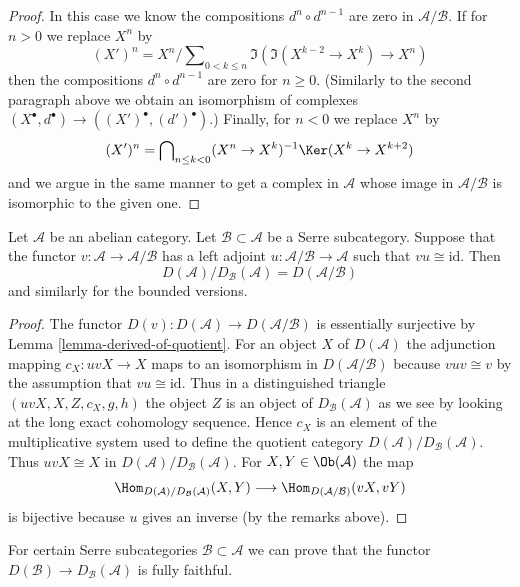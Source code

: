 \begin{proof}
\medskip\noindent
In this case we know the compositions $d^n \circ d^{n - 1}$
are zero in $\mathcal{A}/\mathcal{B}$. If for $n > 0$ we replace
$X^n$ by
$$
(X')^n = X^n/\sum\nolimits_{0 < k \leq n} \Im(\Im(X^{k - 2} \to X^k) \to X^n)
$$
then the compositions $d^n \circ d^{n - 1}$ are zero for $n \geq 0$.
(Similarly to the second paragraph above we obtain an isomorphism of
complexes
$(X^\bullet, d^\bullet) \to ((X')^\bullet, (d')^\bullet)$.)
Finally, for $n < 0$ we replace $X^n$ by
$$
(X')^n = \bigcap\nolimits_{n \leq k < 0}
(X^n \to X^k)^{-1}\Ker(X^k \to X^{k + 2})
$$
and we argue in the same manner to get a complex in $\mathcal{A}$
whose image in $\mathcal{A}/\mathcal{B}$ is isomorphic to the given one.
\end{proof}

\begin{lemma}
\label{lemma-quotient-by-serre-easy}
Let $\mathcal{A}$ be an abelian category.
Let $\mathcal{B} \subset \mathcal{A}$ be a Serre subcategory.
Suppose that the functor $v : \mathcal{A} \to \mathcal{A}/\mathcal{B}$
has a left adjoint $u : \mathcal{A}/\mathcal{B} \to \mathcal{A}$
such that $vu \cong \text{id}$. Then
$$
D(\mathcal{A})/D_\mathcal{B}(\mathcal{A}) = D(\mathcal{A}/\mathcal{B})
$$
and similarly for the bounded versions.
\end{lemma}

\begin{proof}
The functor $D(v) : D(\mathcal{A}) \to D(\mathcal{A}/\mathcal{B})$
is essentially surjective by
Lemma \ref{lemma-derived-of-quotient}.
For an object $X$ of $D(\mathcal{A})$ the adjunction mapping
$c_X : uvX \to X$ maps to an isomorphism in $D(\mathcal{A}/\mathcal{B})$
because $vuv \cong v$ by the assumption that $vu \cong \text{id}$.
Thus in a distinguished triangle $(uvX, X, Z, c_X, g, h)$ the object
$Z$ is an object of $D_\mathcal{B}(\mathcal{A})$ as we see by looking
at the long exact cohomology sequence.
Hence $c_X$ is an element of the multiplicative system used to define
the quotient category $D(\mathcal{A})/D_\mathcal{B}(\mathcal{A})$.
Thus $uvX \cong X$ in $D(\mathcal{A})/D_\mathcal{B}(\mathcal{A})$.
For $X, Y \in \Ob(\mathcal{A})$ the map
$$
\Hom_{D(\mathcal{A})/D_\mathcal{B}(\mathcal{A})}(X, Y)
\longrightarrow
\Hom_{D(\mathcal{A}/\mathcal{B})}(vX, vY)
$$
is bijective because $u$ gives an inverse (by the remarks above).
\end{proof}

\noindent
For certain Serre subcategories $\mathcal{B} \subset \mathcal{A}$
we can prove that the functor
$D(\mathcal{B}) \to D_\mathcal{B}(\mathcal{A})$
is fully faithful.

